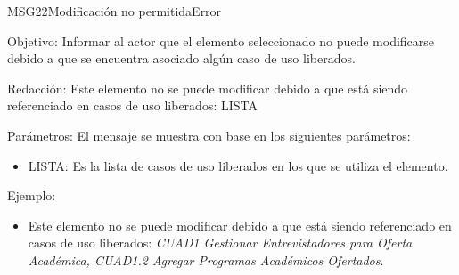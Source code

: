 \begin{mensaje}{MSG22}{Modificación no permitida}{Error}
	\item [Objetivo:] Informar al actor que el elemento seleccionado no puede modificarse debido a que se encuentra asociado algún caso de uso liberados.
	\item[Redacción:] Este elemento no se puede modificar debido a que está siendo referenciado en casos de uso liberados: LISTA
	\item[Parámetros:] El mensaje se muestra con base en los siguientes parámetros:
	\begin{itemize}
		\item LISTA: Es la lista de casos de uso liberados en los que se utiliza el elemento.
	\end{itemize}
	\item[Ejemplo:] \begin{itemize}
		\item Este elemento no se puede modificar debido a que está siendo referenciado en casos de uso liberados: {\em CUAD1 Gestionar Entrevistadores para Oferta Académica, CUAD1.2 Agregar Programas Académicos Ofertados}.
	\end{itemize}
\end{mensaje}